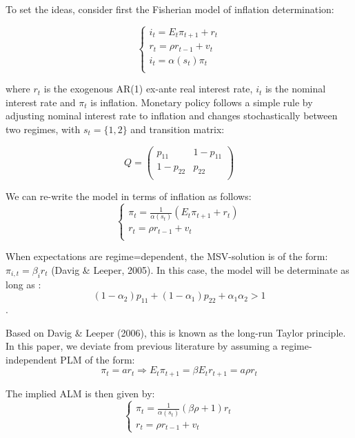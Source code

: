 \documentclass[12pt,reqno]{article}
\numberwithin{equation}{section}
\begin{document}
To set the ideas, consider first the Fisherian model of inflation determination:

$$
\begin{cases}
i_t = E_t \pi_{t+1} + r_t \\
r_t = \rho r_{t-1} + v_t \\
i_t = \alpha(s_t) \pi_t \\
\end{cases}
$$

where $ r_t $ is the exogenous AR(1) ex-ante real interest rate, $ i_t $ is the nominal interest rate and $\pi_t $ is inflation. Monetary policy follows a simple rule by adjusting nominal interest rate to inflation and changes stochastically between two regimes, with $s_t = \{1,2 \} $ and transition matrix:

$$
Q=\begin{pmatrix}
p_{11} & 1-p_{11} \\
1-p_{22} & p_{22} \\
\end{pmatrix}
$$

We can re-write the model in terms of inflation as follows: \\

$$
\begin{cases}
\pi_t = \frac{1}{\alpha(s_t)}(E_t \pi_{t+1} + r_t) \\
r_t = \rho r_{t-1} + v_t \\
\end{cases}
$$

When expectations are regime=dependent, the MSV-solution is of the form: $ \pi_{i,t} = \beta_i r_t $ (Davig \& Leeper, 2005). In this case, the model will be determinate as long as :\\

$$ (1-\alpha_2) p_{11} +(1-\alpha_1) p_{22} + \alpha_1 \alpha_2 > 1 $$. 

Based on Davig \& Leeper (2006), this is known as the long-run Taylor principle.\\
 

In this paper, we deviate from previous literature by assuming a regime-independent PLM of the form: \\

$$
\pi_t = a r_t  \Rightarrow E_t \pi_{t+1} = \beta E_t r_{t+1} = a \rho r_t 
$$

The implied ALM is then given by: \\

$$
\begin{cases}
\pi_t = \frac{1}{\alpha(s_t)} (\beta \rho + 1) r_t \\
r_t= \rho r_{t-1} + v_t 
\end{cases}
$$ 
\end{document}
